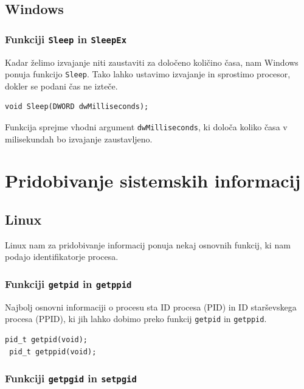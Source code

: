 \documentclass[a4paper,12pt,openright]{book}
\begin{document}
\subsection{Windows}

\subsubsection{Funkciji \texttt{Sleep} in \texttt{SleepEx}}

Kadar želimo izvajanje niti zaustaviti za določeno količino časa, nam Windows ponuja funkcijo \texttt{Sleep}.
Tako lahko ustavimo izvajanje in sprostimo procesor, dokler se podani čas ne izteče.

\begin{lstlisting}[style=func]
 void Sleep(DWORD dwMilliseconds);
\end{lstlisting}

Funkcija sprejme vhodni argument \texttt{dwMilliseconds}, ki določa koliko časa v milisekundah bo izvajanje zaustavljeno.

\section{Pridobivanje sistemskih informacij}

\subsection{Linux}

Linux nam za pridobivanje informacij ponuja nekaj osnovnih funkcij, ki nam podajo identifikatorje procesa.

\subsubsection{Funkciji \texttt{getpid} in \texttt{getppid}}

Najbolj osnovni informaciji o procesu sta ID procesa (PID) in ID starševskega procesa (PPID), ki jih lahko dobimo preko funkcij \texttt{getpid} in \texttt{getppid}.

\begin{lstlisting}[style=func]
 pid_t getpid(void);
 pid_t getppid(void);
\end{lstlisting}

\subsubsection{Funkciji \texttt{getpgid} in \texttt{setpgid}}
\end{document}
